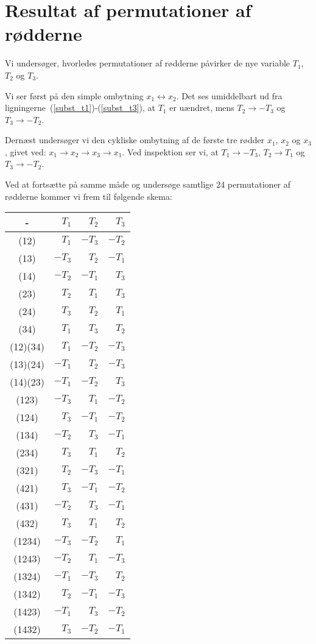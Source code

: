 \documentclass[12pt,oneside,a4paper]{article}
\begin{document}
\section{Resultat af permutationer af rødderne}
Vi undersøger, hvorledes permutationer af rødderne påvirker de nye variable
$T_1$, $T_2$ og $T_3$.

Vi ser først på den simple ombytning $x_1 \leftrightarrow x_2$. Det ses
umiddelbart ud fra ligningerne~(\ref{subst_t1})-(\ref{subst_t3}), at $T_1$ er uændret, mens $T_2 \rightarrow -T_3$ og $T_3 \rightarrow -T_2$.

Dernæst undersøger vi den cykliske ombytning af de første tre rødder $x_1$,
$x_2$ og $x_3$, givet ved: $x_1 \rightarrow x_2 \rightarrow x_3 \rightarrow
x_1$.  Ved inspektion ser vi, at $T_1 \rightarrow -T_3$, $T_2 \rightarrow T_1$
og $T_3 \rightarrow -T_2$.

Ved at fortsætte på samme måde og undersøge samtlige 24 permutationer af
rødderne kommer vi frem til følgende skema:

\begin{tabular}{|c|r|r|r|}
    \hline 
    -    & $ T_1$ & $ T_2$ & $ T_3$ \\
    \hline 
    (12) & $ T_1$ & $-T_3$ & $-T_2$ \\
    (13) & $-T_3$ & $ T_2$ & $-T_1$ \\
    (14) & $-T_2$ & $-T_1$ & $ T_3$ \\
    (23) & $ T_2$ & $ T_1$ & $ T_3$ \\
    (24) & $ T_3$ & $ T_2$ & $ T_1$ \\
    (34) & $ T_1$ & $ T_3$ & $ T_2$ \\
    \hline 
    (12)(34) & $ T_1$ & $-T_2$ & $-T_3$ \\
    (13)(24) & $-T_1$ & $ T_2$ & $-T_3$ \\
    (14)(23) & $-T_1$ & $-T_2$ & $ T_3$ \\
    \hline 
    (123) & $-T_3$ & $ T_1$ & $-T_2$ \\
    (124) & $ T_3$ & $-T_1$ & $-T_2$ \\
    (134) & $-T_2$ & $ T_3$ & $-T_1$ \\
    (234) & $ T_3$ & $ T_1$ & $ T_2$ \\
    (321) & $ T_2$ & $-T_3$ & $-T_1$ \\
    (421) & $ T_3$ & $-T_1$ & $-T_2$ \\
    (431) & $-T_2$ & $ T_3$ & $-T_1$ \\
    (432) & $ T_3$ & $ T_1$ & $ T_2$ \\
    \hline 
    (1234) & $-T_3$ & $-T_2$ & $ T_1$ \\
    (1243) & $-T_2$ & $ T_1$ & $-T_3$ \\
    (1324) & $-T_1$ & $-T_3$ & $ T_2$ \\
    (1342) & $ T_2$ & $-T_1$ & $-T_3$ \\
    (1423) & $-T_1$ & $ T_3$ & $-T_2$ \\
    (1432) & $ T_3$ & $-T_2$ & $-T_1$ \\
    \hline
\end{tabular}
\end{document}
